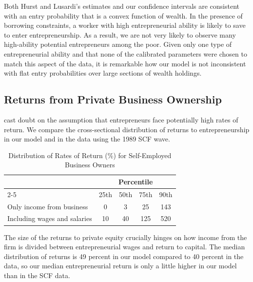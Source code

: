 \documentclass[\latexroot/\projectname]{subfiles}
\begin{document}
Both Hurst and Lusardi's estimates and our confidence intervals are consistent with an entry probability that is a convex function of wealth. In the presence of borrowing constraints, a worker with high entrepreneurial ability is likely to save to enter entrepreneurship. As a result, we are not very likely to observe many high-ability potential entrepreneurs among the poor. Given only one type of entrepreneurial ability and that none of the calibrated parameters were chosen to match this aspect of the data, it is remarkable how our model is not inconsistent with flat entry probabilities over large sections of wealth holdings.

\subsection{Returns from Private Business Ownership}

\cite{Moskowitz2002-ax} cast doubt on the assumption that entrepreneurs face potentially high rates of return. We compare the cross-sectional distribution of returns to entrepreneurship in our model and in the data using the 1989 SCF wave.

\begin{table}[htbp]
  \centering
  \caption{Distribution of Rates of Return (\%) for Self-Employed Business Owners}
  \whenintegrated{\label{tab:returns}}
  \begin{tabular}{lcccc}
    \hline\hline
    & \multicolumn{4}{c}{Percentile} \\
    \cline{2-5}
    & 25th & 50th & 75th & 90th \\
    \hline
    Only income from business & 0 & 3 & 25 & 143 \\
    Including wages and salaries & 10 & 40 & 125 & 520 \\
    \hline
  \end{tabular}
\end{table}

The size of the returns to private equity crucially hinges on how income from the firm is divided between entrepreneurial wages and return to capital. The median distribution of returns is 49 percent in our model compared to 40 percent in the data, so our median entrepreneurial return is only a little higher in our model than in the SCF data.

\smartbib
\end{document}
